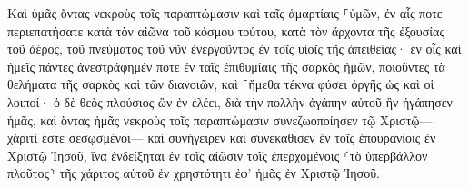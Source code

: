 \documentclass{openreader}
\begin{document}
Καὶ ὑμᾶς ὄντας νεκροὺς τοῖς παραπτώμασιν καὶ ταῖς ἁμαρτίαις ⸀ὑμῶν, 
ἐν αἷς ποτε περιεπατήσατε κατὰ τὸν αἰῶνα τοῦ κόσμου τούτου, κατὰ τὸν ἄρχοντα τῆς ἐξουσίας τοῦ ἀέρος, τοῦ πνεύματος τοῦ νῦν ἐνεργοῦντος ἐν τοῖς υἱοῖς τῆς ἀπειθείας· 
ἐν οἷς καὶ ἡμεῖς πάντες ἀνεστράφημέν ποτε ἐν ταῖς ἐπιθυμίαις τῆς σαρκὸς ἡμῶν, ποιοῦντες τὰ θελήματα τῆς σαρκὸς καὶ τῶν διανοιῶν, καὶ ⸀ἤμεθα τέκνα φύσει ὀργῆς ὡς καὶ οἱ λοιποί· 
ὁ δὲ θεὸς πλούσιος ὢν ἐν ἐλέει, διὰ τὴν πολλὴν ἀγάπην αὐτοῦ ἣν ἠγάπησεν ἡμᾶς, 
καὶ ὄντας ἡμᾶς νεκροὺς τοῖς παραπτώμασιν συνεζωοποίησεν τῷ Χριστῷ— χάριτί ἐστε σεσῳσμένοι— 
καὶ συνήγειρεν καὶ συνεκάθισεν ἐν τοῖς ἐπουρανίοις ἐν Χριστῷ Ἰησοῦ, 
ἵνα ἐνδείξηται ἐν τοῖς αἰῶσιν τοῖς ἐπερχομένοις ⸂τὸ ὑπερβάλλον πλοῦτος⸃ τῆς χάριτος αὐτοῦ ἐν χρηστότητι ἐφ’ ἡμᾶς ἐν Χριστῷ Ἰησοῦ. 
\end{document}
